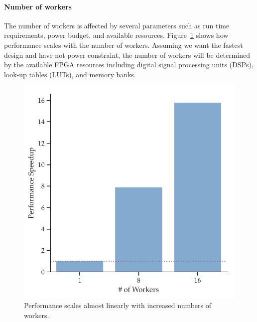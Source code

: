 \paragraph{Number of workers}
The number of workers is affected by several parameters such as run time requirements, power budget, and available resources. Figure~\ref{fig:worker-perf} shows how performance scales with the number of workers. Assuming we want the fastest design and have not power constraint, the number of workers will be determined by the available FPGA resources including digital signal processing units (DSPs), look-up tables (LUTs), and memory banks.

\begin{figure}
\centering
\includegraphics[width=\columnwidth]{hfbs-figs/worker_scaling.pdf}
\caption{Performance scales almost linearly with increased numbers of workers.}
\label{fig:worker-perf}
\end{figure}




